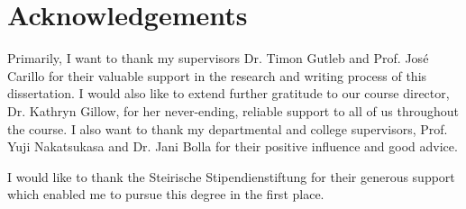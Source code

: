 \chapter*{Acknowledgements}

Primarily, I want to thank my supervisors Dr. Timon Gutleb and Prof. José Carillo for their valuable support in the research and writing process of this dissertation.
I would also like to extend further gratitude to our course director, Dr. Kathryn Gillow, for her never-ending, reliable support to all of us throughout the course.
I also want to thank my departmental and college supervisors, Prof. Yuji Nakatsukasa and Dr. Jani Bolla for their positive influence and good advice.

I would like to thank the Steirische Stipendienstiftung for their generous support which enabled me to pursue this degree in the first place.


